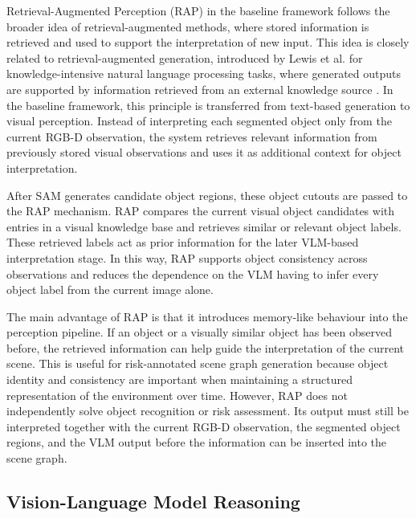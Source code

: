 {\small

Retrieval-Augmented Perception (RAP) in the baseline framework follows the broader idea of retrieval-augmented methods, where stored information is retrieved and used to support the interpretation of new input. This idea is closely related to retrieval-augmented generation, introduced by Lewis et al. for knowledge-intensive natural language processing tasks, where generated outputs are supported by information retrieved from an external knowledge source \cite{lewis2020rag}. In the baseline framework, this principle is transferred from text-based generation to visual perception. Instead of interpreting each segmented object only from the current RGB-D observation, the system retrieves relevant information from previously stored visual observations and uses it as additional context for object interpretation.

After SAM generates candidate object regions, these object cutouts are passed to the RAP mechanism. RAP compares the current visual object candidates with entries in a visual knowledge base and retrieves similar or relevant object labels. These retrieved labels act as prior information for the later VLM-based interpretation stage. In this way, RAP supports object consistency across observations and reduces the dependence on the VLM having to infer every object label from the current image alone.

The main advantage of RAP is that it introduces memory-like behaviour into the perception pipeline. If an object or a visually similar object has been observed before, the retrieved information can help guide the interpretation of the current scene. This is useful for risk-annotated scene graph generation because object identity and consistency are important when maintaining a structured representation of the environment over time. However, RAP does not independently solve object recognition or risk assessment. Its output must still be interpreted together with the current RGB-D observation, the segmented object regions, and the VLM output before the information can be inserted into the scene graph.

}

\subsection{Vision-Language Model Reasoning}


